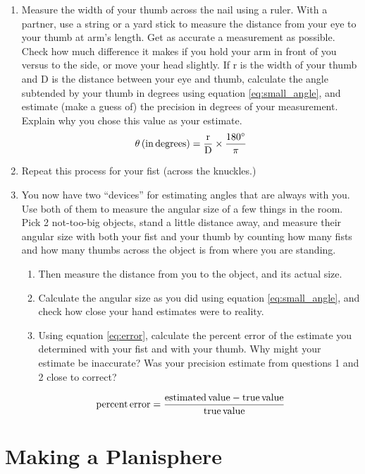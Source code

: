 \documentclass[11pt]{article}
\begin{document}
\begin{enumerate}
    \item Measure the width of your thumb across the nail using a ruler. With a partner, use a string or a yard stick to measure the distance from your eye to your thumb at arm's length. Get as accurate a measurement as possible. Check how much difference it makes if you hold your arm in front of you versus to the side, or move your head slightly. If r is the width of your thumb and D is the distance between your eye and thumb, calculate the angle subtended by your thumb in degrees using equation \ref{eq:small_angle}, and estimate (make a guess of) the precision in degrees of your measurement. Explain why you chose this value as your estimate.
    \begin{equation} \label{eq:small_angle}
        \theta \, \rm{(in \, degrees)} = \frac{r}{D} \times \frac{180^\circ}{\pi}
    \end{equation}
    \item Repeat this process for your fist (across the knuckles.)
    \item You now have two ``devices'' for estimating angles that are always with you. Use both of them to measure the angular size of a few things in the room.  Pick 2 not-too-big objects, stand a little distance away, and measure their angular size with both your fist and your thumb by counting how many fists and how many thumbs across the object is from where you are standing.
    \begin{enumerate}
        \item Then measure the distance from you to the object, and its actual size.
        \item Calculate the angular size as you did using equation \ref{eq:small_angle}, and check how close your hand estimates were to reality.
        \item Using equation \ref{eq:error}, calculate the percent error of the estimate you determined with your fist and with your thumb. Why might your estimate be inaccurate? Was your precision estimate from questions 1 and 2 close to correct?
    \end{enumerate}
    \begin{equation} \label{eq:error}
        \rm{percent \, error} = \frac{\rm{estimated \, value - true \, value}}{true \, value}
    \end{equation}
\end{enumerate}


\section{Making a Planisphere}
\end{document}
